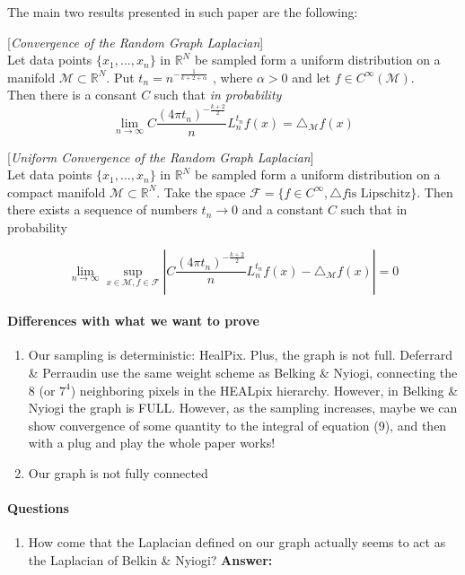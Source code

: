 The main two results presented in such paper are the following:

\begin{theorem}{[\textit{Convergence of the Random Graph Laplacian}]}
	\\Let data points $\{x_1, ..., x_n\}$ in $\mathbb R^N$ be sampled form a uniform distribution on a manifold $\mathcal M \subset \mathbb R^N$. Put $t_n = n^{-\frac{1}{k+2+\alpha}}$ , where $\alpha>0$ and let $f\in C^\infty(\mathcal M)$.\\
	Then there is a consant $C$ such that \textit{in probability}
	$$\lim_{n\rightarrow\infty} C \frac{(4\pi t_n)^{-\frac{k+2}{2}}}{n} L_n^{t_n}f(x) = \triangle_{\mathcal M}f(x)$$
\end{theorem}

\begin{theorem}{[\textit{Uniform Convergence of the Random Graph Laplacian}]}
	\\Let data points $\{x_1, ..., x_n\}$ in $\mathbb R^N$ be sampled form a uniform distribution on a compact manifold $\mathcal M \subset \mathbb R^N$. Take the space $\mathcal F = \{f\in C^\infty , \triangle f \text{is Lipschitz}\}$. Then there exists a sequence of numbers $t_n\rightarrow 0$ and a constant $C$ such that in probability

	$$\lim_{n\rightarrow\infty} \sup_{x\in \mathcal M, f\in \mathcal F} \left| C \frac{(4\pi t_n)^{-\frac{k+2}{2}}}{n} L_n^{t_n}f(x) - \triangle_{\mathcal M}f(x) \right|= 0$$
\end{theorem}

\paragraph{Differences with what we want to prove}
\begin{enumerate}
	\item Our sampling is deterministic: HealPix. Plus, the graph is not full. Deferrard \& Perraudin use the same weight scheme as Belking \& Nyiogi, connecting the $8$ (or $7^4$) neighboring pixels in the HEALpix hierarchy. However, in Belking \& Nyiogi the graph is FULL. However, as the sampling increases, maybe we can show convergence of some quantity to the integral of equation (9), and then with a plug and play the whole paper works!
	\item Our graph is not fully connected
\end{enumerate}

\paragraph{Questions}
\begin{enumerate}
	\item How come that the Laplacian defined on our graph actually seems to act as the Laplacian of Belkin \& Nyiogi? \bf{Answer}: 
\end{enumerate}
